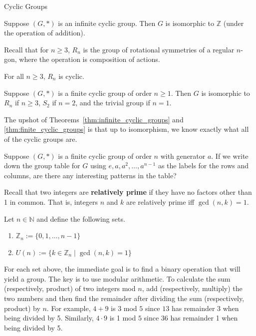 \begin{section}{Cyclic Groups}
\begin{theorem}\label{thm:infinite_cyclic_groups}
Suppose $(G,*)$ is an infinite cyclic group.  Then $G$ is isomorphic to $\mathbb{Z}$ (under the operation of addition).
\end{theorem}

Recall that for $n\geq3$, $R_n$ is the group of rotational symmetries of a regular $n$-gon, where the operation is composition of actions.

\begin{theorem}
For all $n\geq 3$, $R_n$ is cyclic.
\end{theorem}

\begin{theorem}\label{thm:finite_cyclic_groups}
Suppose $(G,*)$ is a finite cyclic group of order $n\geq 1$.  Then $G$ is isomorphic to $R_n$ if $n\geq 3$, $S_2$ if $n=2$, and the trivial group if $n=1$.
\end{theorem}

The upshot of Theorems~\ref{thm:infinite_cyclic_groups} and \ref{thm:finite_cyclic_groups} is that up to isomorphism, we know exactly what all of the cyclic groups are.

\begin{exercise}
Suppose $(G,*)$ is a finite cyclic group of order $n$ with generator $a$.  If we write down the group table for $G$ using $e, a, a^2, \ldots, a^{n-1}$ as the labels for the rows and columns, are there any interesting patterns in the table?
\end{exercise}

Recall that two integers are \textbf{relatively prime} if they have no factors other than 1 in common.  That is, integers $n$ and $k$ are relatively prime iff $\gcd(n,k)=1$.

\begin{definition}
Let $n\in\mathbb{N}$ and define the following sets.
\begin{enumerate}[label=\rm{(\alph*)}]
\item $\mathbb{Z}_n:=\{0,1,\ldots,n-1\}$
\item $U(n):=\{k\in\mathbb{Z}_n\mid \gcd(n,k)=1\}$
\end{enumerate}
\end{definition}

For each set above, the immediate goal is to find a binary operation that will yield a group.  The key is to use modular arithmetic.  To calculate the sum (respectively, product) of two integers mod $n$, add (respectively, multiply) the two numbers and then find the remainder after dividing the sum (respectively, product) by $n$. For example, $4+9$ is $3$ mod $5$ since $13$ has remainder 3 when being divided by 5.  Similarly, $4\cdot 9$ is 1 mod $5$ since 36 has remainder 1 when being divided by 5.


\end{section}
